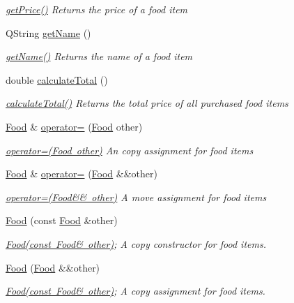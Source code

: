 \begin{DoxyCompactItemize}
\begin{DoxyCompactList}\small\item\em \mbox{\hyperlink{class_food_a16683d009125620dd07432fbe7711597}{get\+Price()}} Returns the price of a food item \end{DoxyCompactList}\item 
Q\+String \mbox{\hyperlink{class_food_a5652293c23e8b797d363c08efc585601}{get\+Name}} ()
\begin{DoxyCompactList}\small\item\em \mbox{\hyperlink{class_food_a5652293c23e8b797d363c08efc585601}{get\+Name()}} Returns the name of a food item \end{DoxyCompactList}\item 
double \mbox{\hyperlink{class_food_ac50c1e254e20ffeda0d28f84e1cc2160}{calculate\+Total}} ()
\begin{DoxyCompactList}\small\item\em \mbox{\hyperlink{class_food_ac50c1e254e20ffeda0d28f84e1cc2160}{calculate\+Total()}} Returns the total price of all purchased food items \end{DoxyCompactList}\item 
\mbox{\hyperlink{class_food}{Food}} \& \mbox{\hyperlink{class_food_abe2267ba02f1b812c71028f427d92d81}{operator=}} (\mbox{\hyperlink{class_food}{Food}} other)
\begin{DoxyCompactList}\small\item\em \mbox{\hyperlink{class_food_abe2267ba02f1b812c71028f427d92d81}{operator=(\+Food other)}} An copy assignment for food items \end{DoxyCompactList}\item 
\mbox{\hyperlink{class_food}{Food}} \& \mbox{\hyperlink{class_food_a0ba9d6f416f396bc8e4a1c2ad519d3eb}{operator=}} (\mbox{\hyperlink{class_food}{Food}} \&\&other)
\begin{DoxyCompactList}\small\item\em \mbox{\hyperlink{class_food_a0ba9d6f416f396bc8e4a1c2ad519d3eb}{operator=(\+Food\&\& other)}} A move assignment for food items \end{DoxyCompactList}\item 
\mbox{\hyperlink{class_food_a365c2d6175447d0fe29e57facc277570}{Food}} (const \mbox{\hyperlink{class_food}{Food}} \&other)
\begin{DoxyCompactList}\small\item\em \mbox{\hyperlink{class_food_a365c2d6175447d0fe29e57facc277570}{Food(const Food\& other)}}; A copy constructor for food items. \end{DoxyCompactList}\item 
\mbox{\hyperlink{class_food_a82c4dcbac6b4bb4ce921bc3aea627387}{Food}} (\mbox{\hyperlink{class_food}{Food}} \&\&other)
\begin{DoxyCompactList}\small\item\em \mbox{\hyperlink{class_food_a365c2d6175447d0fe29e57facc277570}{Food(const Food\& other)}}; A copy assignment for food items. \end{DoxyCompactList}\end{DoxyCompactItemize}


